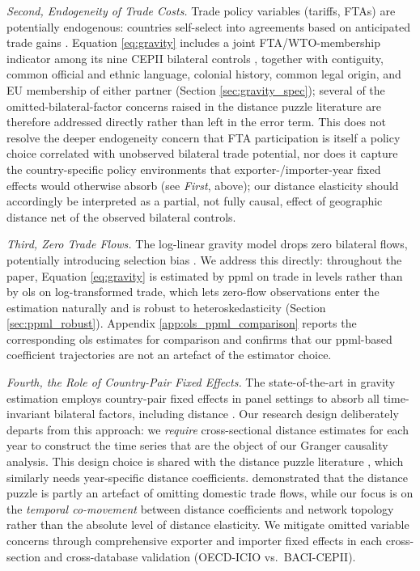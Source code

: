 \documentclass[preprint, 3p,
authoryear]{elsarticle} %
\begin{document}
\textit{Second, Endogeneity of Trade Costs.} Trade policy variables
(tariffs, FTAs) are potentially endogenous: countries self-select into
agreements based on anticipated trade gains
\citep{baier2007, larch2025estimating}. Equation \eqref{eq:gravity}
includes a joint FTA/WTO-membership indicator among its nine CEPII
bilateral controls \citep{conte2022cepii}, together with contiguity,
common official and ethnic language, colonial history, common legal
origin, and EU membership of either partner (Section
\ref{sec:gravity_spec}); several of the omitted-bilateral-factor
concerns raised in the distance puzzle literature
\citep{disdier2008, brun2005, yotov2012distance} are therefore addressed
directly rather than left in the error term. This does not resolve the
deeper endogeneity concern that FTA participation is itself a policy
choice correlated with unobserved bilateral trade potential, nor does it
capture the country-specific policy environments that
exporter-/importer-year fixed effects would otherwise absorb (see
\textit{First}, above); our distance elasticity should accordingly be
interpreted as a partial, not fully causal, effect of geographic
distance net of the observed bilateral controls.

\textit{Third, Zero Trade Flows.} The log-linear gravity model drops
zero bilateral flows, potentially introducing selection bias
\citep{SantosSilvaTenreyro2006, helpman2008}. We address this directly:
throughout the paper, Equation \eqref{eq:gravity} is estimated by
\gls{ppml} on trade in levels rather than by \gls{ols} on
log-transformed trade, which lets zero-flow observations enter the
estimation naturally and is robust to heteroskedasticity
\citep{SantosSilvaTenreyro2006} (Section \ref{sec:ppml_robust}).
Appendix \ref{app:ols_ppml_comparison} reports the corresponding
\gls{ols} estimates for comparison and confirms that our
\gls{ppml}-based coefficient trajectories are not an artefact of the
estimator choice.

\textit{Fourth, the Role of Country-Pair Fixed Effects.} The
state-of-the-art in gravity estimation employs country-pair fixed
effects in panel settings to absorb all time-invariant bilateral
factors, including distance
\citep{larch2025estimating, yotov2024evolution}. Our research design
deliberately departs from this approach: we \textit{require}
cross-sectional distance estimates for each year to construct the time
series that are the object of our Granger causality analysis. This
design choice is shared with the distance puzzle literature
\citep{disdier2008, brun2005, yotov2012distance}, which similarly needs
year-specific distance coefficients. \citet{yotov2012distance}
demonstrated that the distance puzzle is partly an artefact of omitting
domestic trade flows, while our focus is on the
\textit{temporal co-movement} between distance coefficients and network
topology rather than the absolute level of distance elasticity. We
mitigate omitted variable concerns through comprehensive exporter and
importer fixed effects in each cross-section and cross-database
validation (OECD-ICIO vs.~BACI-CEPII).
\end{document}
